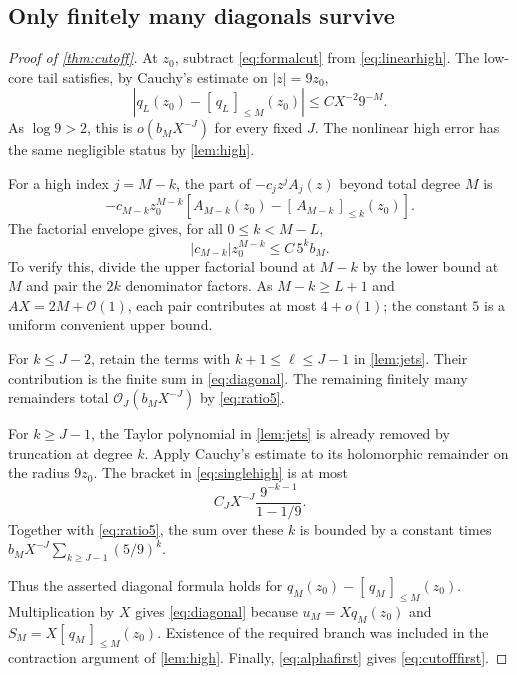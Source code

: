 \documentclass[11pt,a4paper]{article}
\theoremstyle{definition}
\numberwithin{equation}{section}
\newcommand{\Oh}{\mathcal O}
\newcommand{\trunc}[2]{[\,#1\,]_{\le #2}}
\begin{document}
\subsection{Only finitely many diagonals survive}
\begin{proof}[Proof of \cref{thm:cutoff}]
At $z_0$, subtract \eqref{eq:formalcut} from \eqref{eq:linearhigh}. The low-core tail satisfies, by Cauchy's estimate on $|z|=9z_0$,
\begin{equation}
 |q_L(z_0)-\trunc{q_L}{M}(z_0)|
 \le C X^{-2}9^{-M}.
 \label{eq:lowcauchy}
\end{equation}
As $\log9>2$, this is $o(b_MX^{-J})$ for every fixed $J$. The nonlinear high error has the same negligible status by \cref{lem:high}.

For a high index $j=M-k$, the part of $-c_jz^jA_j(z)$ beyond total degree $M$ is
\begin{equation}
 -c_{M-k}z_0^{M-k}
 \left[A_{M-k}(z_0)-\trunc{A_{M-k}}{k}(z_0)\right].
 \label{eq:singlehigh}
\end{equation}
The factorial envelope gives, for all $0\le k<M-L$,
\begin{equation}
 |c_{M-k}|z_0^{M-k}\le C\,5^k b_M.
 \label{eq:ratio5}
\end{equation}
To verify this, divide the upper factorial bound at $M-k$ by the lower bound at $M$ and pair the $2k$ denominator factors. As $M-k\ge L+1$ and $AX=2M+\Oh(1)$, each pair contributes at most $4+o(1)$; the constant $5$ is a uniform convenient upper bound.

For $k\le J-2$, retain the terms with $k+1\le\ell\le J-1$ in \cref{lem:jets}. Their contribution is the finite sum in \eqref{eq:diagonal}. The remaining finitely many remainders total $\Oh_J(b_MX^{-J})$ by \eqref{eq:ratio5}.

For $k\ge J-1$, the Taylor polynomial in \cref{lem:jets} is already removed by truncation at degree $k$. Apply Cauchy's estimate to its holomorphic remainder on the radius $9z_0$. The bracket in \eqref{eq:singlehigh} is at most
\[
 C_JX^{-J}\frac{9^{-k-1}}{1-1/9}.
\]
Together with \eqref{eq:ratio5}, the sum over these $k$ is bounded by a constant times
$b_MX^{-J}\sum_{k\ge J-1}(5/9)^k$.

Thus the asserted diagonal formula holds for $q_M(z_0)-\trunc{q_M}{M}(z_0)$. Multiplication by $X$ gives \eqref{eq:diagonal} because $u_M=Xq_M(z_0)$ and $S_M=X\trunc{q_M}{M}(z_0)$. Existence of the required branch was included in the contraction argument of \cref{lem:high}. Finally, \eqref{eq:alphafirst} gives \eqref{eq:cutofffirst}.
\end{proof}
\end{document}
